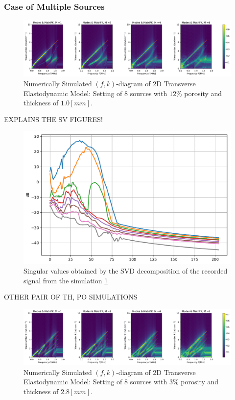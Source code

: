 \subsubsection{Case of Multiple Sources}
\begin{figure}[!h]
	\centering
	\includegraphics[width=\textwidth]{images/TimeMultSous/2DTimeS8P12ElasticFK10M780_y.pdf}
	\caption{Numerically Simulated $(f,k)$-diagram of 2D Transverse Elastodynamic Model: Setting of 8 sources with $12\%$ porosity and thickness of $1.0 [mm]$.}
	\label{FK-DiagramS8P12M10}
\end{figure}
EXPLAINS THE SV FIGURES!
\begin{figure}[!h]
	\centering
	\includegraphics[scale=.5]{images/TimeMultSous/2DTimeS8P12Elastic10_SV.pdf}
	\caption{Singular values obtained by the SVD decomposition of the recorded signal from the simulation \ref{FK-DiagramS8P12M10}}
	\label{SVD-S8P12M10}
\end{figure}
OTHER PAIR OF TH, PO SIMULATIONS
\begin{figure}[!h]
	\centering
	\includegraphics[width=\textwidth]{images/TimeMultSous/2DTimeS8P3ElasticFK28M780_y.pdf}
	\caption{Numerically Simulated $(f,k)$-diagram of 2D Transverse Elastodynamic Model: Setting of 8 sources with $3\%$ porosity and thickness of $2.8 [mm]$.}
	\label{FK-DiagramS8P3M28}
\end{figure}

